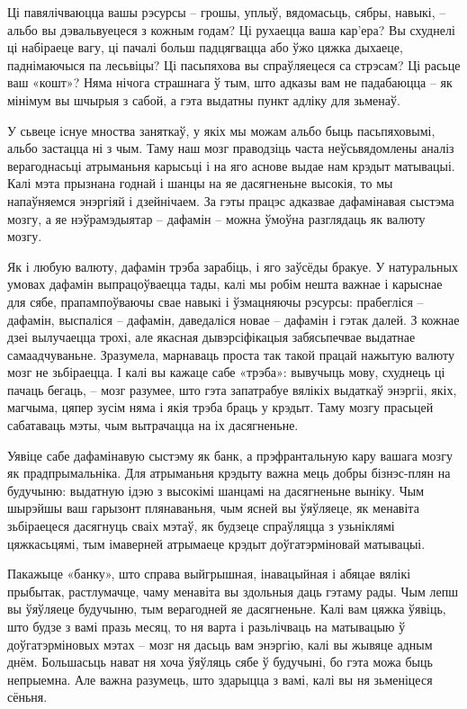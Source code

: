 Ці павялічваюцца вашы рэсурсы – грошы, уплыў, вядомасьць, сябры, навыкі, – альбо вы дэвальвуецеся з кожным годам? Ці рухаецца ваша кар'ера? Вы схуднелі ці набіраеце вагу, ці пачалі больш падцягвацца або ўжо цяжка дыхаеце, паднімаючыся па лесьвіцы? Ці пасьпяхова вы спраўляецеся са стрэсам? Ці расьце ваш «кошт»? Няма нічога страшнага ў тым, што адказы вам не падабаюцца – як мінімум вы шчырыя з сабой, а гэта выдатны пункт адліку для зьменаў.

У сьвеце існуе мноства заняткаў, у якіх мы можам альбо быць пасьпяховымі, альбо застацца ні з чым. Таму наш мозг праводзіць часта неўсьвядомлены аналіз верагоднасьці атрыманьня карысьці і на яго аснове выдае нам крэдыт матывацыі. Калі мэта прызнана годнай і шанцы на яе дасягненьне высокія, то мы напаўняемся энэргіяй і дзейнічаем. За гэты працэс адказвае дафамінавая сыстэма мозгу, а яе нэўрамэдыятар – дафамін – можна ўмоўна разглядаць як валюту мозгу.

Як і любую валюту, дафамін трэба зарабіць, і яго заўсёды бракуе. У натуральных умовах дафамін выпрацоўваецца тады, калі мы робім нешта важнае і карыснае для сябе, прапампоўваючы свае навыкі і ўзмацняючы рэсурсы: прабегліся – дафамін, выспаліся – дафамін, даведаліся новае – дафамін і гэтак далей. З кожнае дзеі вылучаецца трохі, але якасная дывэрсіфікацыя забясьпечвае выдатнае самаадчуваньне. Зразумела, марнаваць проста так такой працай нажытую валюту мозг не зьбіраецца. І калі вы кажаце сабе «трэба»: вывучыць мову, схуднець ці пачаць бегаць, – мозг разумее, што гэта запатрабуе вялікіх выдаткаў энэргіі, якіх, магчыма, цяпер зусім няма і якія трэба браць у крэдыт. Таму мозгу прасьцей сабатаваць мэты, чым вытрачацца на іх дасягненьне.

Уявіце сабе дафамінавую сыстэму як банк, а прэфрантальную кару вашага мозгу як прадпрымальніка. Для атрыманьня крэдыту важна мець добры бізнэс-плян на будучыню: выдатную ідэю з высокімі шанцамі на дасягненьне выніку. Чым шырэйшы ваш гарызонт плянаваньня, чым ясней вы ўяўляеце, як менавіта зьбіраецеся дасягнуць сваіх мэтаў, як будзеце спраўляцца з узьніклямі цяжкасьцямі, тым імаверней атрымаеце крэдыт доўгатэрміновай матывацыі.

Пакажыце «банку», што справа выйгрышная, інавацыйная і абяцае вялікі прыбытак, растлумачце, чаму менавіта вы здольныя даць гэтаму рады. Чым лепш вы ўяўляеце будучыню, тым верагодней яе дасягненьне. Калі вам цяжка ўявіць, што будзе з вамі празь месяц, то ня варта і разьлічваць на матывацыю ў доўгатэрміновых мэтах – мозг ня дасьць вам энэргію, калі вы жывяце адным днём. Большасьць нават ня хоча ўяўляць сябе ў будучыні, бо гэта можа быць непрыемна. Але важна разумець, што здарыцца з вамі, калі вы ня зьменіцеся сёньня.

